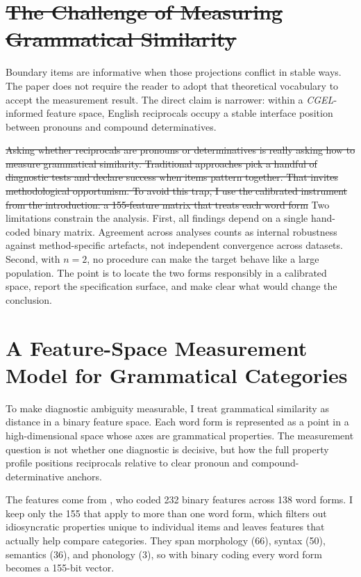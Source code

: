 \documentclass[12pt]{article}
\newif\ifcjlsubmission
\providecommand{\DIFaddtex}[1]{{\protect\color{DIFgreen}#1}} %
\providecommand{\DIFdeltex}[1]{{\protect\color{red}\sout{#1}}}                      %
\providecommand{\DIFaddbegin}{} %
\providecommand{\DIFaddend}{} %
\providecommand{\DIFdelbegin}{} %
\providecommand{\DIFdelend}{} %
\providecommand{\DIFadd}[1]{\texorpdfstring{\DIFaddtex{#1}}{#1}} %
\providecommand{\DIFdel}[1]{\texorpdfstring{\DIFdeltex{#1}}{}} %
\newcommand{\DIFscaledelfig}{0.5}
\newlength{\DIFdelgraphicswidth} %
\newlength{\DIFdelgraphicsheight} %
\newcommand{\DIFaddincludegraphics}[2][]{{\color{DIFgreen}\fbox{\DIFOincludegraphics[#1]{#2}}}} %
\newcommand{\DIFdelincludegraphics}[2][]{%
\sbox{\DIFdelgraphicsbox}{\DIFOincludegraphics[#1]{#2}}%
\settoboxwidth{\DIFdelgraphicswidth}{\DIFdelgraphicsbox} %
\settoboxtotalheight{\DIFdelgraphicsheight}{\DIFdelgraphicsbox} %
\scalebox{\DIFscaledelfig}{%
\parbox[b]{\DIFdelgraphicswidth}{\usebox{\DIFdelgraphicsbox}\\[-\baselineskip] \rule{\DIFdelgraphicswidth}{0em}}\llap{\resizebox{\DIFdelgraphicswidth}{\DIFdelgraphicsheight}{%
\setlength{\unitlength}{\DIFdelgraphicswidth}%
\begin{picture}(1,1)%
\thicklines\linethickness{2pt} %
{\color[rgb]{1,0,0}\put(0,0){\framebox(1,1){}}}%
{\color[rgb]{1,0,0}\put(0,0){\line( 1,1){1}}}%
{\color[rgb]{1,0,0}\put(0,1){\line(1,-1){1}}}%
\end{picture}%
}\hspace*{3pt}}} %
} %
\DeclareRobustCommand{\DIFaddbegin}{\DIFOaddbegin \let\includegraphics\DIFaddincludegraphics} %
\DeclareRobustCommand{\DIFaddend}{\DIFOaddend \let\includegraphics\DIFOincludegraphics} %
\DeclareRobustCommand{\DIFdelbegin}{\DIFOdelbegin \let\includegraphics\DIFdelincludegraphics} %
\DeclareRobustCommand{\DIFdelend}{\DIFOaddend \let\includegraphics\DIFOincludegraphics} %
\begin{document}
\DIFdelbegin \section{\DIFdel{The Challenge of Measuring Grammatical Similarity}}
\addtocounter{section}{-1}%
\DIFdelend \DIFaddbegin \DIFadd{Boundary items are informative when those projections conflict in stable ways. The paper does not require the reader to adopt that theoretical vocabulary to accept the measurement result. The direct claim is narrower: within a }\textit{\DIFadd{CGEL}}\DIFadd{-informed feature space, English reciprocals occupy a stable interface position between pronouns and compound determinatives.
}\DIFaddend 

\DIFdelbegin \DIFdel{Asking whether reciprocals are pronouns or determinatives is really asking how to measure grammatical similarity. Traditional approaches pick a handful of diagnostic tests and declare success when items pattern together.
That invites methodological opportunism. To avoid this trap, I use the calibrated instrument from the introduction: a 155-feature matrix that treats each word form }\DIFdelend \DIFaddbegin \DIFadd{Two limitations constrain the analysis. First, all findings depend on a single hand-coded binary matrix. Agreement across analyses counts as internal robustness against method-specific artefacts, not independent convergence across datasets. Second, with $n = 2$, no procedure can make the target behave like a large population. The point is to locate the two forms responsibly in a calibrated space, report the specification surface, and make clear what would change the conclusion.
}


\section{\DIFadd{A Feature-Space Measurement Model for Grammatical Categories}}

\DIFadd{To make diagnostic ambiguity measurable, I treat grammatical similarity as distance in a binary feature space. Each word form is represented }\DIFaddend as a point in a high-dimensional space whose axes are grammatical properties. \DIFaddbegin \DIFadd{The measurement question is not whether one diagnostic is decisive, but how the full property profile positions reciprocals relative to clear pronoun and compound-determinative anchors.
}\DIFaddend 

\ifcjlsubmission
The features come from earlier coding work on this dataset. I keep only the 155 that apply to more than one word form, which filters out idiosyncratic properties unique to individual items and leaves features that actually help compare categories. They span morphology (66), syntax (50), semantics (36), and phonology (3), so with binary coding every word form becomes a 155-bit vector.
\else
The features come from \textcite{reynolds2021}, who coded 232 binary features across 138 word forms. I keep only the 155 that apply to more than one word form, which filters out idiosyncratic properties unique to individual items and leaves features that actually help compare categories. They span morphology (66), syntax (50), semantics (36), and phonology (3), so with binary coding every word form becomes a 155-bit vector.
\fi
\end{document}
